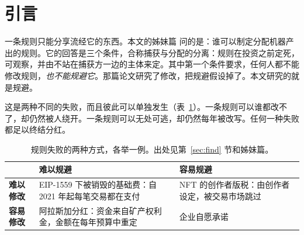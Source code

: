 \maketitle

\begin{abstract}
\noindent 一条分享机器产出的规则，只能发放它收得到的部分。姊妹篇证明，对自主产出支付分红，要求规则事前定死、可观察、并独立于捕获方；它同时假定规则无法被规避。本文放开这个假定：捕获方可以付出一定成本，让产出绕过规则。由此得到四个结果。第一，规则至多收到绕过它所需的成本，所以一条已经分离的规则，如果建立在容易绕开的税基上，什么也发不出来。第二，当捕获方完全相同时，规则卡在生产链的哪一环并不重要，重要的只是各环的绕行成本，而且不同环节的绕行成本可以相加。第三，当捕获方的生产率不同时，对必需投入的征收无法跟随各自的租金，最优规则由两部分组成：在产出上按份额征收，直到它的绕行成本为止；不足的部分，在瓶颈处按平均生产率补足。第四，一个不受约束的瓶颈所有者，收取的恰好是接收方自己会选择的那个征收额，并把它留给自己。因此，规则必须卡在瓶颈上，并且与瓶颈的所有者相分离。

\medskip
\noindent\textbf{关键词：}执行；规避；瓶颈；算力；分配；人工智能；交易手续费。

\noindent\textbf{JEL：}D23, H21, H26, L12, O33。
\end{abstract}

\section{引言}

一条规则只能分享流经它的东西。本文的姊妹篇 \citet{TitanSeparation2026} 问的是：谁可以制定分配机器产出的规则。它的回答是三个条件，合称捕获与分配的分离：规则在投资之前定死，可观察，并由不站在捕获方一边的主体来定。其中第一个条件要求，任何人都不能修改规则，\emph{也不能规避它}。那篇论文研究了修改，把规避假设掉了。本文研究的就是规避。

这是两种不同的失败，而且彼此可以单独发生（表~\ref{tab:twobytwo}）。一条规则可以谁都改不了，却仍然被人绕开。一条规则可以无处可逃，却仍然每年被改写。任何一种失败都足以终结分红。

\begin{table}[b]
\centering
\caption{规则失败的两种方式，各举一例。出处见第~\ref{sec:find} 节和姊妹篇。}
\label{tab:twobytwo}
\small
\renewcommand{\arraystretch}{1.3}
\begin{tabular}{@{}>{\raggedright\arraybackslash}p{}>{\raggedright\arraybackslash}p{}>{\raggedright\arraybackslash}p{}@{}}
\toprule
 & \textbf{难以规避} & \textbf{容易规避}\\
\midrule
\textbf{难以修改} & EIP-1559 下被销毁的基础费：自 2021 年起每笔交易都在支付 &
NFT 的创作者版税：由创作者设定，被交易市场跳过\\
\textbf{容易修改} & 阿拉斯加分红：资金来自矿产权利金，金额在每年预算中重定 & 企业自愿承诺\\
\bottomrule
\end{tabular}
\end{table}


